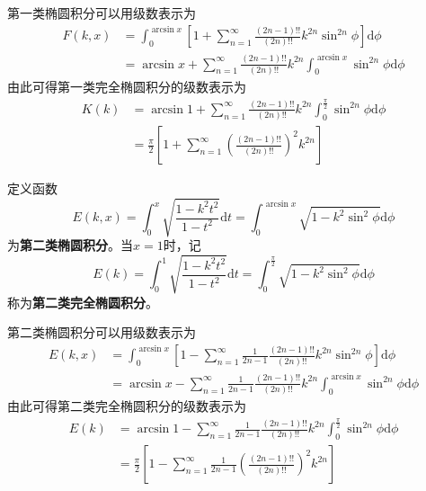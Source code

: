 第一类椭圆积分可以用级数表示为
\begin{align}
	F(k,x) & = \int_0^{\arcsin x} \left[1+\sum_{n=1}^\infty \frac{(2n-1)!!}{(2n)!!}k^{2n}\sin^{2n}\phi\right]\mathrm{d}\phi \nonumber \\
	& = \arcsin x + \sum_{n=1}^\infty \frac{(2n-1)!!}{(2n)!!}k^{2n}\int_0^{\arcsin x} \sin^{2n}\phi \mathrm{d}\phi
	\label{chp6:第一类椭圆积分-级数表示}
\end{align}
由此可得第一类完全椭圆积分的级数表示为
\begin{align}
	K(k) & = \arcsin 1 + \sum_{n=1}^\infty \frac{(2n-1)!!}{(2n)!!}k^{2n}\int_0^{\frac{\pi}{2}} \sin^{2n}\phi \mathrm{d}\phi \nonumber \\
	& = \frac{\pi}{2}\left[1+\sum_{n=1}^\infty \left(\frac{(2n-1)!!}{(2n)!!}\right)^2k^{2n}\right]
	\label{chp6:第一类完全椭圆积分-级数表示}
\end{align}

定义函数
\begin{equation}
	E(k,x) = \int_0^x \sqrt{\frac{1-k^2t^2}{1-t^2}}\mathrm{d}t = \int_0^{\arcsin x} \sqrt{1-k^2\sin^2\phi}\mathrm{d}\phi
	\label{第二类椭圆积分-定义}
\end{equation}
为{\bf 第二类椭圆积分}。当$x=1$时，记
\begin{equation}
	E(k) = \int_0^1 \sqrt{\frac{1-k^2t^2}{1-t^2}}\mathrm{d}t = \int_0^{\frac{\pi}{2}} \sqrt{1-k^2\sin^2\phi}\mathrm{d}\phi
	\label{第二类完全椭圆积分-定义}
\end{equation}
称为{\bf 第二类完全椭圆积分}。

第二类椭圆积分可以用级数表示为
\begin{align}
	E(k,x) & = \int_0^{\arcsin x} \left[1-\sum_{n=1}^\infty \frac{1}{2n-1}\frac{(2n-1)!!}{(2n)!!}k^{2n}\sin^{2n}\phi\right]\mathrm{d}\phi \nonumber \\
	& = \arcsin x - \sum_{n=1}^\infty \frac{1}{2n-1}\frac{(2n-1)!!}{(2n)!!}k^{2n}\int_0^{\arcsin x} \sin^{2n}\phi \mathrm{d}\phi
	\label{第二类椭圆积分-级数表示}
\end{align}
由此可得第二类完全椭圆积分的级数表示为
\begin{align}
	E(k) & = \arcsin 1 - \sum_{n=1}^\infty \frac{1}{2n-1}\frac{(2n-1)!!}{(2n)!!}k^{2n}\int_0^{\frac{\pi}{2}} \sin^{2n}\phi \mathrm{d}\phi \nonumber \\
	& = \frac{\pi}{2}\left[1-\sum_{n=1}^\infty \frac{1}{2n-1}\left(\frac{(2n-1)!!}{(2n)!!}\right)^2k^{2n}\right]
	\label{chp6:第二类完全椭圆积分-级数表示}
\end{align}

